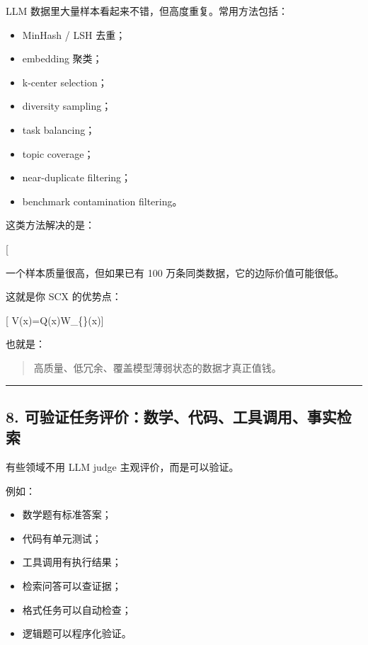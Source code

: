 \documentclass[
  12pt,
]{ctexart}
\providecommand{\tightlist}{%
  \setlength{\itemsep}{0pt}\setlength{\parskip}{0pt}}
\begin{document}
LLM 数据里大量样本看起来不错，但高度重复。常用方法包括：

\begin{itemize}
\tightlist
\item
  MinHash / LSH 去重；
\item
  embedding 聚类；
\item
  k-center selection；
\item
  diversity sampling；
\item
  task balancing；
\item
  topic coverage；
\item
  near-duplicate filtering；
\item
  benchmark contamination filtering。
\end{itemize}

这类方法解决的是：

{[}  \neq \text{marginal value high}{]}

一个样本质量很高，但如果已有 100 万条同类数据，它的边际价值可能很低。

这就是你 SCX 的优势点：

{[} V(x)=Q(x)\cdot [1-D(x)]\cdot W\_\{\}(x){]}

也就是：

\begin{quote}
高质量、低冗余、覆盖模型薄弱状态的数据才真正值钱。
\end{quote}

\begin{center}\rule{0.5\linewidth}{0.5pt}\end{center}

\subsection{8.
可验证任务评价：数学、代码、工具调用、事实检索}\label{ux53efux9a8cux8bc1ux4efbux52a1ux8bc4ux4ef7ux6570ux5b66ux4ee3ux7801ux5de5ux5177ux8c03ux7528ux4e8bux5b9eux68c0ux7d22}

有些领域不用 LLM judge 主观评价，而是可以验证。

例如：

\begin{itemize}
\tightlist
\item
  数学题有标准答案；
\item
  代码有单元测试；
\item
  工具调用有执行结果；
\item
  检索问答可以查证据；
\item
  格式任务可以自动检查；
\item
  逻辑题可以程序化验证。
\end{itemize}
\end{document}
